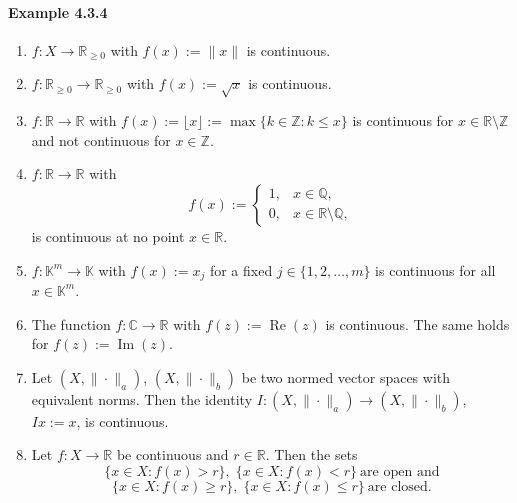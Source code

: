 \documentclass[12pt]{article}
\begin{document}
\paragraph{Example 4.3.4}
\begin{enumerate}[label=({\arabic*})]
	\item $f : X \to \mathbb R_{\ge 0}$ with $f(x) := \|x\|$ is continuous.
	\item $f : \mathbb R_{\ge 0} \to \mathbb R_{\ge 0}$ with $f(x) := \sqrt{x}$ is continuous.
	\item $f : \mathbb R \to \mathbb R$ with $f(x) := \lfloor x \rfloor := \max\{k \in \mathbb Z : k \le x\}$ is continuous for $x \in \mathbb R \setminus \mathbb Z$ and not continuous for $x \in \mathbb Z$.
	\item $f : \mathbb R \to \mathbb R$ with
	\[
		f(x) := \begin{cases}
			1, & x \in \mathbb Q, \\
			0, & x \in \mathbb R \setminus \mathbb Q,
		\end{cases}
	\]
	is continuous at no point $x \in \mathbb R$.
	\item $f : \mathbb K^m \to \mathbb K$ with $f(x) := x_j$ for a fixed $j \in \{1,2,\dots,m\}$ is continuous for all $x \in \mathbb K^m$.
	\item The function $f : \mathbb C \to \mathbb R$ with $f(z) := \operatorname{Re}(z)$ is continuous. The same holds for $f(z) := \operatorname{Im}(z)$.
	\item Let $(X,\|\cdot\|_a)$, $(X,\|\cdot\|_b)$ be two normed vector spaces with equivalent norms. Then the identity $I : (X,\|\cdot\|_a) \to (X,\|\cdot\|_b)$, $Ix := x$, is continuous.
	\item Let $f : X \to \mathbb R$ be continuous and $r \in \mathbb R$. Then the sets
	\[
		\{x \in X : f(x) > r\},\; \{x \in X : f(x) < r\}\ \text{are open and}
	\]
	\[
		\{x \in X : f(x) \ge r\},\; \{x \in X : f(x) \le r\}\ \text{are closed}.
	\]
\end{enumerate}
\end{document}
